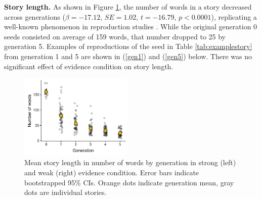 \documentclass[10pt,letterpaper]{article}
\begin{document}
\textbf{Story length.} As shown in Figure \ref{fig:storylength}, the number of words in a story decreased across generations ($\beta = -17.12$, $SE = 1.02$, $t = -16.79$, $p < 0.0001$), replicating a well-known phenomenon in reproduction studies \cite{Bartlett:1932}. While the original generation 0 seeds consisted on average of 159 words, that number dropped to 25 by generation 5. Examples of reproductions of the seed in Table \ref{tab:examplestory} from generation 1 and 5 are shown in (\ref{gen1}) and (\ref{gen5}) below. There was no significant effect of evidence condition on story length.


\begin{figure}[]
	\includegraphics[width=0.48\textwidth]{pics/corpus_length.pdf}
	\caption{Mean story length in number of words by generation in strong (left) and weak (right) evidence condition. Error bars indicate bootstrapped 95\% CIs. Orange dots indicate generation mean, gray dots are individual stories.} 
	\label{fig:storylength}
\end{figure}
\end{document}

